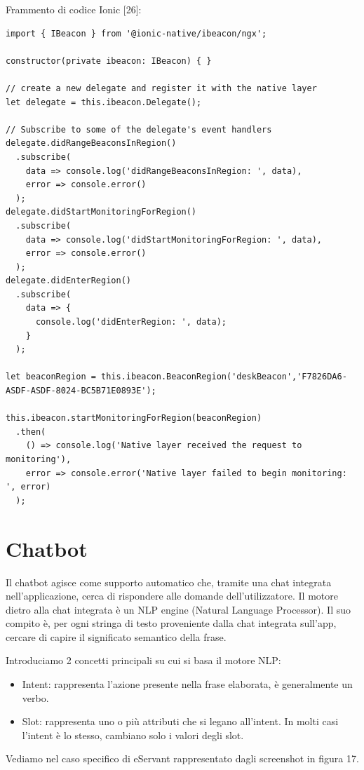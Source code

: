 Frammento di codice Ionic [26]:
\begin{lstlisting}
import { IBeacon } from '@ionic-native/ibeacon/ngx';

constructor(private ibeacon: IBeacon) { }

// create a new delegate and register it with the native layer
let delegate = this.ibeacon.Delegate();

// Subscribe to some of the delegate's event handlers
delegate.didRangeBeaconsInRegion()
  .subscribe(
    data => console.log('didRangeBeaconsInRegion: ', data),
    error => console.error()
  );
delegate.didStartMonitoringForRegion()
  .subscribe(
    data => console.log('didStartMonitoringForRegion: ', data),
    error => console.error()
  );
delegate.didEnterRegion()
  .subscribe(
    data => {
      console.log('didEnterRegion: ', data);
    }
  );

let beaconRegion = this.ibeacon.BeaconRegion('deskBeacon','F7826DA6-ASDF-ASDF-8024-BC5B71E0893E');

this.ibeacon.startMonitoringForRegion(beaconRegion)
  .then(
    () => console.log('Native layer received the request to monitoring'),
    error => console.error('Native layer failed to begin monitoring: ', error)
  );
\end{lstlisting}

\section{Chatbot}

Il chatbot agisce come supporto automatico che, tramite una chat integrata nell'applicazione, cerca di rispondere
alle domande dell'utilizzatore.
Il motore dietro alla chat integrata è un NLP engine (Natural Language Processor).
Il suo compito è, per ogni stringa di testo proveniente dalla chat integrata sull'app, cercare di capire
il significato semantico della frase.

Introduciamo 2 concetti principali su cui si basa il motore NLP:

\begin{itemize}
\item Intent: rappresenta l'azione presente nella frase elaborata, è generalmente un verbo.
\item Slot: rappresenta uno o più attributi che si legano all'intent. In molti casi l'intent è lo stesso,
cambiano solo i valori degli slot.
\end{itemize}

Vediamo nel caso specifico di eServant rappresentato dagli screenshot in figura 17.


